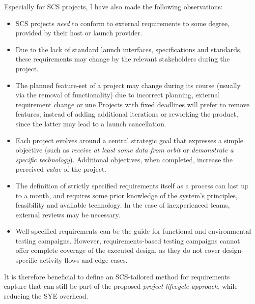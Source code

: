 \documentclass[a4paper,nobib,justified,final]{tufte-book}
\begin{document}
Especially for \acs{SCS} projects, I have also made the following observations:
\begin{itemize}[itemsep=-1ex]
	\item \acs{SCS} projects \emph{need} to conform to external requirements to some degree, provided by their host or launch provider.
	\item Due to the lack of standard launch interfaces, specifications and standards, these requirements may change by the relevant stakeholders during the project.
	\item The planned feature-set of a project may change during its course (usually via the removal of functionality) due to incorrect planning, external requirement change or une
	Projects with fixed deadlines will prefer to remove features, instead of adding additional iterations or reworking the product, since the latter may lead to a launch cancellation.
	\item Each project evolves around a central strategic goal that expresses a simple objective (such as \emph{receive at least some data from orbit} or \emph{demonstrate a specific technology}). Additional objectives, when completed, increase the perceived \emph{value} of the project.
	\item The definition of strictly specified requirements itself as a process can last up to a month, and requires some prior knowledge of the system's principles, feasibility and available technology. In the case of inexperienced teams, external reviews may be necessary.
	\item Well-specified requirements can be the guide for functional and environmental testing campaigns. However, requirements-based testing campaigns cannot offer complete coverage of the executed design, as they do not cover design-specific activity flows and edge cases.
\end{itemize}

It is therefore beneficial to define an \acs{SCS}-tailored method for requirements capture that can still be part of the proposed \emph{project lifecycle approach}, while reducing the \ac{SYE} overhead.
\end{document}
